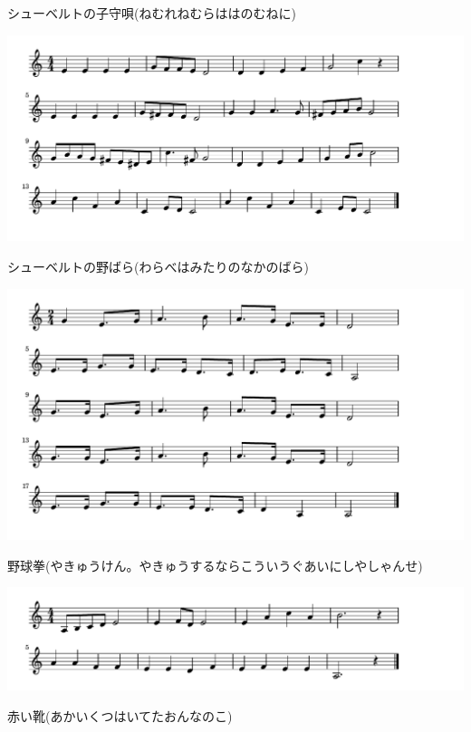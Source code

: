 \documentclass[a4paper]{ltjsarticle}
\begin{document}
\vspace{-10mm} \hspace{10mm}
シューベルトの子守唄(ねむれねむらははのむねに)

\includegraphics[clip]{schubertnobara_crop.pdf}

\vspace{-10mm} \hspace{10mm}
シューベルトの野ばら(わらべはみたりのなかのばら)

\includegraphics[clip]{yakyuken_crop.pdf}

\vspace{-10mm} \hspace{10mm}
野球拳(やきゅうけん。やきゅうするならこういうぐあいにしやしゃんせ)

\includegraphics[clip]{akaikutsu_crop.pdf}

\vspace{-10mm} \hspace{10mm}
赤い靴(あかいくつはいてたおんなのこ)
\end{document}

